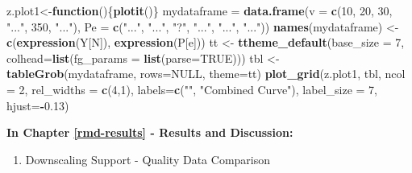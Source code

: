 \documentclass[12pt,twoside]{reedthesis}
\newenvironment{Shaded}{\begin{snugshade}}{\end{snugshade}}
\newcommand{\ControlFlowTok}[1]{\textcolor[rgb]{0.13,0.29,0.53}{\textbf{#1}}}
\newcommand{\DataTypeTok}[1]{\textcolor[rgb]{0.13,0.29,0.53}{#1}}
\newcommand{\DecValTok}[1]{\textcolor[rgb]{0.00,0.00,0.81}{#1}}
\newcommand{\FloatTok}[1]{\textcolor[rgb]{0.00,0.00,0.81}{#1}}
\newcommand{\KeywordTok}[1]{\textcolor[rgb]{0.13,0.29,0.53}{\textbf{#1}}}
\newcommand{\NormalTok}[1]{#1}
\newcommand{\OperatorTok}[1]{\textcolor[rgb]{0.81,0.36,0.00}{\textbf{#1}}}
\newcommand{\OtherTok}[1]{\textcolor[rgb]{0.56,0.35,0.01}{#1}}
\newcommand{\StringTok}[1]{\textcolor[rgb]{0.31,0.60,0.02}{#1}}
\providecommand{\tightlist}{%
  \setlength{\itemsep}{0pt}\setlength{\parskip}{0pt}}
\begin{document}
\begin{Shaded}
\begin{Highlighting}[]
\NormalTok{z.plot1<-}\ControlFlowTok{function}\NormalTok{()\{}\KeywordTok{plotit}\NormalTok{()\}}
\NormalTok{mydataframe =}\StringTok{ }\KeywordTok{data.frame}\NormalTok{(}\DataTypeTok{v =} \KeywordTok{c}\NormalTok{(}\DecValTok{10}\NormalTok{, }\DecValTok{20}\NormalTok{, }\DecValTok{30}\NormalTok{, }\StringTok{"..."}\NormalTok{, }\DecValTok{350}\NormalTok{, }\StringTok{"..."}\NormalTok{), }\DataTypeTok{Pe =} \KeywordTok{c}\NormalTok{(}\StringTok{"..."}\NormalTok{, }\StringTok{"..."}\NormalTok{, }\StringTok{"?"}\NormalTok{, }\StringTok{"..."}\NormalTok{, }\StringTok{"..."}\NormalTok{, }\StringTok{"..."}\NormalTok{))}
\KeywordTok{names}\NormalTok{(mydataframe) <-}\StringTok{ }\KeywordTok{c}\NormalTok{(}\KeywordTok{expression}\NormalTok{(Y[N]), }\KeywordTok{expression}\NormalTok{(P[e]))}
\NormalTok{tt <-}\StringTok{ }\KeywordTok{ttheme_default}\NormalTok{(}\DataTypeTok{base_size =} \DecValTok{7}\NormalTok{, }\DataTypeTok{colhead=}\KeywordTok{list}\NormalTok{(}\DataTypeTok{fg_params =} \KeywordTok{list}\NormalTok{(}\DataTypeTok{parse=}\OtherTok{TRUE}\NormalTok{)))}
\NormalTok{tbl <-}\StringTok{ }\KeywordTok{tableGrob}\NormalTok{(mydataframe, }\DataTypeTok{rows=}\OtherTok{NULL}\NormalTok{, }\DataTypeTok{theme=}\NormalTok{tt)}
\KeywordTok{plot_grid}\NormalTok{(z.plot1, tbl, }\DataTypeTok{ncol =} \DecValTok{2}\NormalTok{, }\DataTypeTok{rel_widths =} \KeywordTok{c}\NormalTok{(}\DecValTok{4}\NormalTok{,}\DecValTok{1}\NormalTok{), }\DataTypeTok{labels=}\KeywordTok{c}\NormalTok{(}\StringTok{""}\NormalTok{, }\StringTok{"Combined Curve"}\NormalTok{), }\DataTypeTok{label_size =} \DecValTok{7}\NormalTok{, }\DataTypeTok{hjust=}\OperatorTok{-}\FloatTok{0.13}\NormalTok{)}
\end{Highlighting}
\end{Shaded}
\normalsize

\textbf{In Chapter \ref{rmd-results} - Results and Discussion:}
\begin{enumerate}
\def\labelenumi{\arabic{enumi}.}
\tightlist
\item
  Downscaling Support - Quality Data Comparison
\end{enumerate}
\tiny
\end{document}
